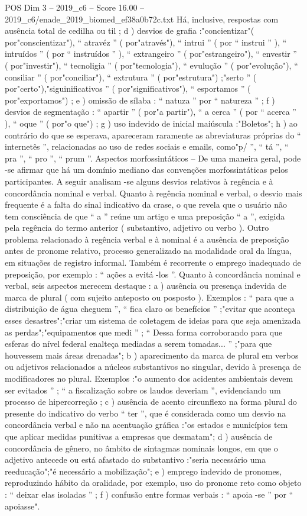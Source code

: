 \begin{textsample}{POS Dim 3 – 2019\_c6 – Score 16.00 – 2019\_c6/enade\_2019\_biomed\_ef38a0b72c.txt}
Há, inclusive, respostas com ausência total de cedilha ou til ; d ) desvios de grafia :"concientizar"( por"conscientizar"), “ atravéz ” ( por"através"), “ intrui ” ( por “ instrui ” ), “ intruídos ” ( por “ instruídos ” ), “ extrangeiro ” ( por"estrangeiro"), “ envestir ” ( por"investir"), “ tecnoligia ” ( por"tecnologia"), “ evulução ” ( por"evolução"), “ consiliar ” ( por"conciliar"), “ extrutura ” ( por"estrutura") ;"serto ” ( por"certo"),"siguinificativos ” ( por"significativos"), “ esportamos ” ( por"exportamos") ; e ) omissão de sílaba : “ natuza ” por “ natureza ” ; f ) desvios de segmentação : “ apartir ” ( por"a partir"), “ a cerca ” ( por “ acerca ” ), “ oque ” ( por"o que") ; g ) uso indevido de inicial maiúscula :"Boletos"; h ) ao contrário do que se esperava, apareceram raramente as abreviaturas próprias do “ internetês ”, relacionadas ao uso de redes sociais e emails, como"p/ ”, “ tá ”, “ pra ”, “ pro ”, “ prum ”.
Aspectos morfossintáticos – De uma maneira geral, pode -se afirmar que há um domínio mediano das convenções morfossintáticas pelos participantes.
A seguir analisam -se alguns desvios relativos à regência e à concordância nominal e verbal.
Quanto à regência nominal e verbal, o desvio mais frequente é a falta do sinal indicativo da crase, o que revela que o usuário não tem consciência de que “ a ” reúne um artigo e uma preposição “ a ”, exigida pela regência do termo anterior ( substantivo, adjetivo ou verbo ).
Outro problema relacionado à regência verbal e à nominal é a ausência de preposição antes de pronome relativo, processo generalizado na modalidade oral da língua, em situações de registro informal.
Também é recorrente o emprego inadequado de preposição, por exemplo : “ ações a evitá -los ”.
Quanto à concordância nominal e verbal, seis aspectos merecem destaque : a ) ausência ou presença indevida de marca de plural ( com sujeito anteposto ou posposto ).
Exemplos : “ para que a distribuição de água cheguem ”, “ fica claro os benefícios ” ;"evitar que aconteça esses desastres";"criar um sistema de coletagem de ideias para que seja amenizada as perdas";"equipamentos que medi ” ; “ Dessa forma corroborando para que esferas do nível federal enalteça mediadas a serem tomadas... ” ;"para que houvessem mais áreas drenadas"; b ) aparecimento da marca de plural em verbos ou adjetivos relacionados a núcleos substantivos no singular, devido à presença de modificadores no plural.
Exemplos :"o aumento dos acidentes ambientais devem ser evitados ” ; “ a fiscalização sobre os laudos deveriam ”, evidenciando um processo de hipercorreção ; c ) ausência de acento circunflexo na forma plural do presente do indicativo do verbo “ ter ”, que é considerada como um desvio na concordância verbal e não na acentuação gráfica :"os estados e municípios tem que aplicar medidas punitivas a empresas que desmatam"; d ) ausência de concordância de gênero, no âmbito de sintagmas nominais longos, em que o adjetivo antecede ou está afastado do substantivo :"seria necessário uma reeducação";"é necessário a mobilização"; e ) emprego indevido de pronomes, reproduzindo hábito da oralidade, por exemplo, uso do pronome reto como objeto : “ deixar elas isoladas ” ; f ) confusão entre formas verbais : “ apoia -se ” por “ apoiasse".

\end{textsample}
